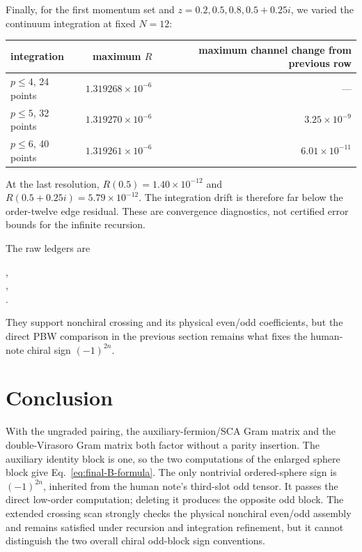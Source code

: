 \documentclass[11pt]{article}
\begin{document}
Finally, for the first momentum set and
\(z=0.2,0.5,0.8,0.5+0.25i\), we varied the continuum integration at fixed
\(N=12\):
\begin{center}
\begin{tabular}{@{}lrr@{}}
\toprule
integration & maximum \(R\) & maximum channel change from previous row\\
\midrule
\(p\le4\), 24 points &\(1.319268\times10^{-6}\)&---\\
\(p\le5\), 32 points &\(1.319270\times10^{-6}\)&\(3.25\times10^{-9}\)\\
\(p\le6\), 40 points &\(1.319261\times10^{-6}\)&\(6.01\times10^{-11}\)\\
\bottomrule
\end{tabular}
\end{center}
At the last resolution, \(R(0.5)=1.40\times10^{-12}\) and
\(R(0.5+0.25i)=5.79\times10^{-12}\).  The integration drift is therefore
far below the order-twelve edge residual.  These are convergence diagnostics,
not certified error bounds for the infinite recursion.

The raw ledgers are
\begin{center}
\small
{},\\
,\\
.
\end{center}
They support nonchiral crossing and its physical even/odd coefficients, but
the direct PBW comparison in the previous section remains what fixes the
human-note chiral sign \((-1)^{2n}\).

\section{Conclusion}

With the ungraded pairing, the auxiliary-fermion/SCA Gram matrix and the
double-Virasoro Gram matrix both factor without a parity insertion.  The
auxiliary identity block is one, so the two computations of the enlarged
sphere block give Eq.~\eqref{eq:final-B-formula}.  The only nontrivial
ordered-sphere sign is \((-1)^{2n}\), inherited from the human note's
third-slot odd tensor.  It passes the direct low-order computation; deleting
it produces the opposite odd block.  The extended crossing scan strongly
checks the physical nonchiral even/odd assembly and remains satisfied under
recursion and integration refinement, but it cannot distinguish the two
overall chiral odd-block sign conventions.
\end{document}
